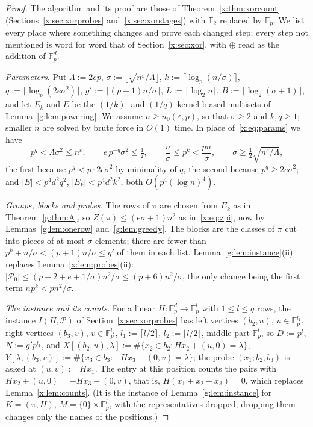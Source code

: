 \documentclass[11pt]{article}
\theoremstyle{definition}
\theoremstyle{remark}
\newcommand{\F}{\mathbb{F}_2}
\newcommand{\Fp}{\mathbb{F}_p}
\newcommand{\eps}{\varepsilon}
\newcommand{\Pq}{\mathcal{P}}
\begin{document}
\begin{proof}
The algorithm and its proof are those of Theorem~\ref{x:thm:xorcount} (Sections~\ref{x:sec:xorprobes} and~\ref{x:sec:xorstages}) with $\F$ replaced by $\Fp$. We list every place where something changes and prove each changed step; every step not mentioned is word for word that of Section~\ref{x:sec:xor}, with $\oplus$ read as the addition of $\Fp^d$.

\emph{Parameters.} Put $\Lambda:=2ep$, $\sigma:=\lfloor\sqrt{n^\eps/\Lambda}\rfloor$, $k:=\lceil\log_p(n/\sigma)\rceil$, $q:=\lceil\log_p(2e\sigma^2)\rceil$, $g':=\lceil(p+1)n/\sigma\rceil$, $L:=\lceil\log_2n\rceil$, $B:=\lceil\log_2(\sigma+1)\rceil$, and let $E_k$ and $E$ be the $(1/k)$- and $(1/q)$-kernel-biased multisets of Lemma~\ref{g:lem:powering}. We assume $n\ge n_0(\eps,p)$, so that $\sigma\ge2$ and $k,q\ge1$; smaller $n$ are solved by brute force in $O(1)$ time. In place of~\eqref{x:eq:params} we have
\[
p^q<\Lambda\sigma^2\le n^\eps,\qquad e\,p^{-q}\sigma^2\le\tfrac12,\qquad\frac n\sigma\le p^k<\frac{pn}\sigma,\qquad\sigma\ge\tfrac12\sqrt{n^\eps/\Lambda},
\]
the first because $p^q<p\cdot2e\sigma^2$ by minimality of $q$, the second because $p^q\ge2e\sigma^2$; and $|E|<p^4d^2q^2$, $|E_k|<p^4d^2k^2$, both $O(p^4(\log n)^4)$.

\emph{Groups, blocks and probes.} The rows of $\pi$ are chosen from $E_k$ as in Theorem~\ref{g:thm:A}, so $Z(\pi)\le(e\sigma+1)n^2$ as in~\eqref{x:eq:zpi}, now by Lemmas~\ref{g:lem:onerow} and~\ref{g:lem:greedy}. The blocks are the classes of $\pi$ cut into pieces of at most $\sigma$ elements; there are fewer than $p^k+n/\sigma<(p+1)n/\sigma\le g'$ of them in each list. Lemma~\ref{g:lem:instance}(ii) replaces Lemma~\ref{x:lem:probes}(ii): $|\Pq_0|\le(p+2+e+1/\sigma)n^2/\sigma\le(p+6)n^2/\sigma$, the only change being the first term $np^k<pn^2/\sigma$.

\emph{The instance and its counts.} For a linear $H\colon\Fp^d\to\Fp^l$ with $1\le l\le q$ rows, the instance $I(H,\Pq)$ of Section~\ref{x:sec:xorprobes} has left vertices $(b_2,u)$, $u\in\Fp^{l_1}$, right vertices $(b_3,v)$, $v\in\Fp^{l_2}$, $l_1:=\lceil l/2\rceil$, $l_2:=\lfloor l/2\rfloor$, middle part $\Fp^l$, so $D:=p^l$, $N:=g'p^{l_1}$, and $X[(b_2,u),\lambda]:=\#\{x_2\in b_2:Hx_2+(u,0)=\lambda\}$, $Y[\lambda,(b_3,v)]:=\#\{x_3\in b_3:-Hx_3-(0,v)=\lambda\}$; the probe $(x_1;b_2,b_3)$ is asked at $(u,v):=Hx_1$. The entry at this position counts the pairs with $Hx_2+(u,0)=-Hx_3-(0,v)$, that is, $H(x_1+x_2+x_3)=0$, which replaces Lemma~\ref{x:lem:counts}. (It is the instance of Lemma~\ref{g:lem:instance} for $K=(\pi,H)$, $M=\{0\}\times\Fp^l$, with the representatives dropped; dropping them changes only the names of the positions.)


\end{proof}
\end{document}
